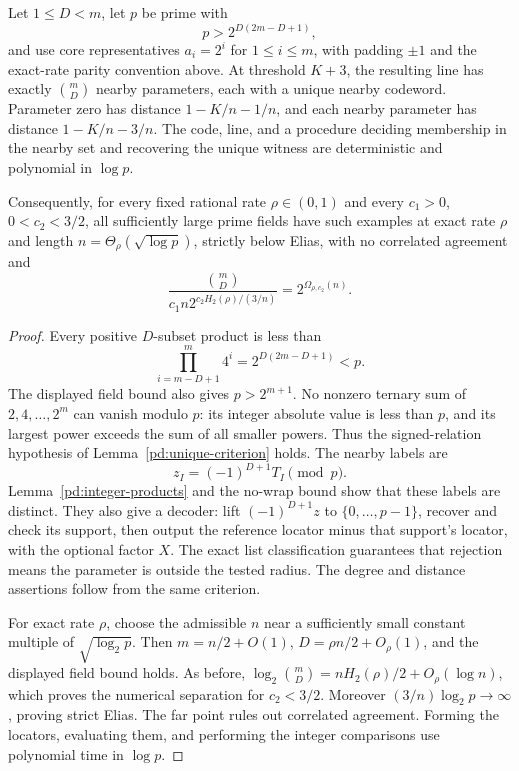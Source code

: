 \begin{theorem}
\label{pd:deterministic}
Let $1\le D<m$, let $p$ be prime with
\[
 p>2^{D(2m-D+1)},
\]
and use core representatives $a_i=2^i$ for $1\le i\le m$, with padding
$\pm1$ and the exact-rate parity convention above. At threshold $K+3$,
the resulting line has exactly $\binom mD$ nearby parameters, each with
a unique nearby codeword. Parameter zero has distance $1-K/n-1/n$,
and each nearby parameter has distance $1-K/n-3/n$. The code, line,
and a procedure deciding membership in the nearby set and recovering
the unique witness are deterministic and polynomial in $\log p$.

Consequently, for every fixed rational rate $\rho\in(0,1)$ and every
$c_1>0$, $0<c_2<3/2$, all sufficiently large prime fields have such
examples at exact rate $\rho$ and length $n=\Theta_\rho(\sqrt{\log p})$,
strictly below Elias, with no correlated agreement and
\[
 \frac{\binom mD}{c_1n2^{c_2H_2(\rho)/(3/n)}}=2^{\Omega_{\rho,c_2}(n)}.
\]
\end{theorem}
\begin{proof}
Every positive $D$-subset product is less than
\[
 \prod_{i=m-D+1}^m4^i=2^{D(2m-D+1)}<p.
\]
The displayed field bound also gives $p>2^{m+1}$. No nonzero ternary
sum of $2,4,\ldots,2^m$ can vanish modulo $p$: its integer absolute
value is less than $p$, and its largest power exceeds the sum of all
smaller powers. Thus the signed-relation hypothesis of
Lemma~\ref{pd:unique-criterion} holds. The nearby labels are
\[
 z_I=(-1)^{D+1}T_I\pmod p.
\]
Lemma~\ref{pd:integer-products} and the no-wrap bound show that these
labels are distinct. They also give a decoder: lift
$(-1)^{D+1}z$ to $\{0,\ldots,p-1\}$, recover and check its support,
then output the reference locator minus that support's locator, with
the optional factor $X$. The exact list classification guarantees
that rejection means the parameter is outside the tested radius.
The degree and distance assertions follow from the same criterion.

For exact rate $\rho$, choose the admissible $n$ near a sufficiently
small constant multiple of $\sqrt{\log_2p}$. Then
$m=n/2+O(1)$, $D=\rho n/2+O_\rho(1)$, and the displayed field bound
holds. As before,
$\log_2\binom mD=nH_2(\rho)/2+O_\rho(\log n)$, which proves the
numerical separation for $c_2<3/2$. Moreover
$(3/n)\log_2p\to\infty$, proving strict Elias. The far point rules
out correlated agreement. Forming the locators, evaluating them, and
performing the integer comparisons use polynomial time in $\log p$.
\end{proof}

